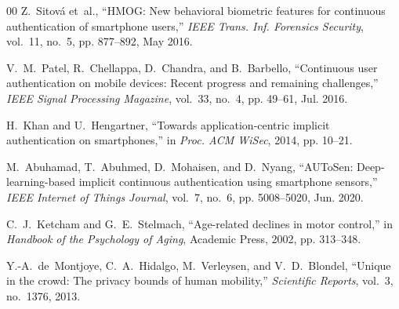 \documentclass[conference]{IEEEtran}
\begin{document}
\begin{thebibliography}{00}
Z.~Sitov\'{a} et~al., ``HMOG: New behavioral biometric features for continuous authentication of smartphone users,'' \textit{IEEE Trans. Inf. Forensics Security}, vol.~11, no.~5, pp. 877--892, May 2016.

V.~M.~Patel, R.~Chellappa, D.~Chandra, and B.~Barbello, ``Continuous user authentication on mobile devices: Recent progress and remaining challenges,'' \textit{IEEE Signal Processing Magazine}, vol.~33, no.~4, pp. 49--61, Jul. 2016.

H.~Khan and U.~Hengartner, ``Towards application-centric implicit authentication on smartphones,'' in \textit{Proc. ACM WiSec}, 2014, pp. 10--21.

M.~Abuhamad, T.~Abuhmed, D.~Mohaisen, and D.~Nyang, ``AUToSen: Deep-learning-based implicit continuous authentication using smartphone sensors,'' \textit{IEEE Internet of Things Journal}, vol.~7, no.~6, pp. 5008--5020, Jun. 2020.

C.~J.~Ketcham and G.~E.~Stelmach, ``Age-related declines in motor control,'' in \textit{Handbook of the Psychology of Aging}, Academic Press, 2002, pp. 313--348.

Y.-A.~de~Montjoye, C.~A.~Hidalgo, M.~Verleysen, and V.~D.~Blondel, ``Unique in the crowd: The privacy bounds of human mobility,'' \textit{Scientific Reports}, vol.~3, no.~1376, 2013.

\end{thebibliography}
\end{document}
